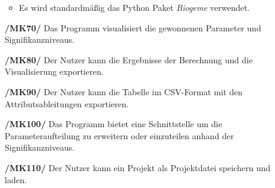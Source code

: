 \documentclass{article}
\begin{document}
\begin{itemize}
    \begin{itemize}
        \item Es wird standardmäßig das Python Paket \textit{Biogeme} verwendet.
    \end{itemize}
    \item[\textbf{/MK70/}] Das Programm visualisiert die gewonnenen Parameter und Signifikanzniveaus.
    \item[\textbf{/MK80/}] Der Nutzer kann die Ergebnisse der Berechnung und die Visualisierung exportieren.
    \item[\textbf{/MK90/}] Der Nutzer kann die Tabelle im CSV-Format mit den Attributsableitungen exportieren.
    \item[\textbf{/MK100/}] Das Programm bietet eine Schnittstelle um die Parameteraufteilung zu erweitern oder einzuteilen anhand der Signifikanzniveaus.
    \item[\textbf{/MK110/}] Der Nutzer kann ein Projekt als Projektdatei speichern und laden.
\end{itemize}
\end{document}
